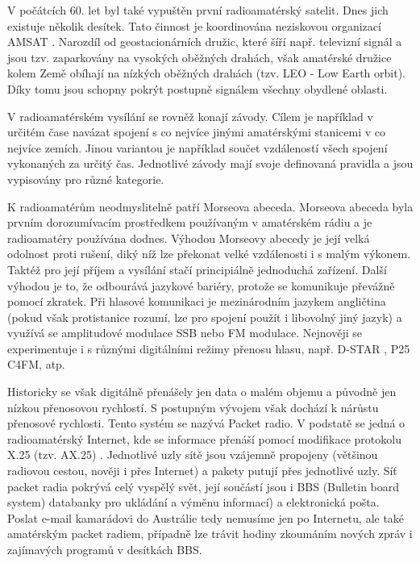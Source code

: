V počátcích 60. let byl také vypuštěn první radioamatérský satelit. Dnes jich existuje několik desítek.
Tato činnost je koordinována neziskovou organizací AMSAT \cite{amsat}. %
Narozdíl od geostacionárních družic, které šíří např. televizní
signál a jsou tzv. zaparkovány na vysokých oběžných drahách, však amatérské
družice kolem Země obíhají na nízkých oběžných drahách (tzv. LEO - Low Earth
orbit). %
Díky tomu jsou schopny pokrýt postupně signálem všechny obydlené oblasti.

V radioamatérském vysílání se rovněž konají závody. Cílem je například v určitém čase navázat spojení s co nejvíce jinými
amatérskými stanicemi v co nejvíce zemích. Jinou variantou je například součet vzdáleností všech spojení vykonaných za určitý
čas. Jednotlivé závody mají svoje definovaná pravidla a jsou vypisovány pro
různé kategorie.

K radioamatérům neodmyslitelně patří Morseova abeceda. Morseova abeceda byla prvním dorozumívacím prostředkem používaným v amatérském rádiu a je radioamatéry používána dodnes.
Výhodou Morseovy %
abecedy je její velká odolnost proti rušení, diký níž lze překonat velké vzdálenosti i s malým
výkonem. Taktéž pro její příjem a vysílání stačí principiálně jednoduchá zařízení. Další výhodou je to, že odbourává jazykové bariéry, protože se komunikuje převážně pomocí zkratek. Při hlasové komunikaci
je mezinárodním jazykem angličtina (pokud však protistanice rozumí, lze pro
spojení použít i libovolný jiný jazyk) a využívá se amplitudové modulace SSB
nebo FM modulace. Nejnověji se experimentuje i s různými digitálními režimy
přenosu hlasu, např. D-STAR \cite{dstar}, %
P25 C4FM, atp.

Historicky se však digitálně přenášely jen data o malém objemu a původně jen nízkou
přenosovou rychlostí. S postupným vývojem však dochází k nárůstu přenosové
rychlosti. Tento systém se nazývá Packet radio. V podstatě se jedná o
radioamatérský Internet, kde se informace přenáší pomocí modifikace protokolu
X.25 (tzv. AX.25) \cite{ax25}. %
Jednotlivé uzly sítě jsou vzájemně propojeny (většinou radiovou cestou, nověji i
přes Internet) a pakety putují přes jednotlivé uzly.
Síť packet radia pokrývá celý vyspělý svět, její součástí jsou i BBS (Bulletin
board system) databanky pro ukládání a výměnu informací) a
elektronická pošta. Poslat e-mail kamarádovi do Austrálie tedy nemusíme jen po Internetu,
ale také amatérským packet radiem, případně lze trávit hodiny zkoumáním nových zpráv i
zajímavých programů v desítkách BBS.

